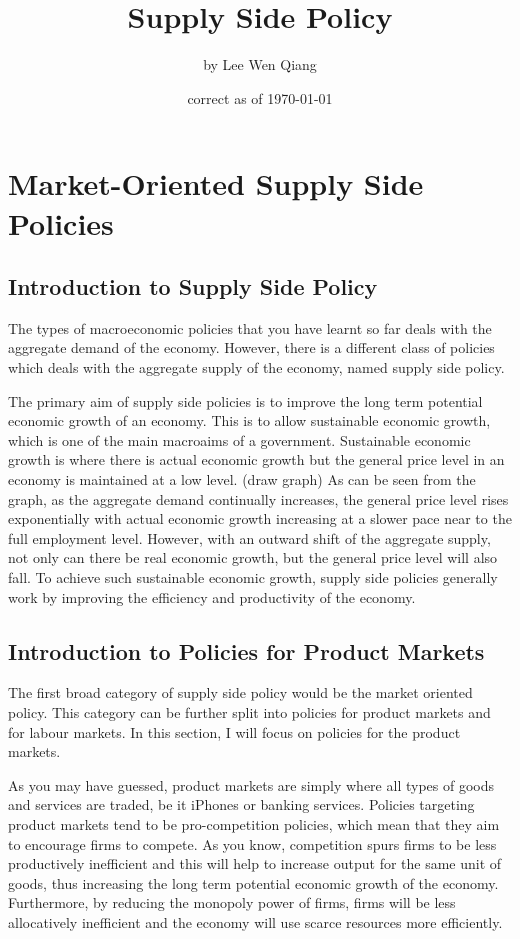 \RequirePackage{../../dominatrix}

\title{Supply Side Policy}
\author{\large by Lee Wen Qiang}
\date{\small correct as of \today}

\maketitle
\tableofcontents
\section{Market-Oriented Supply Side Policies}
\subsection{Introduction to Supply Side Policy}
The types of macroeconomic policies that you have learnt so far deals with the aggregate demand of the economy. However, there is a different class of policies which deals with the aggregate supply of the economy, named supply side policy.

The primary aim of supply side policies is to improve the long term potential economic growth of an economy. This is to allow sustainable economic growth, which is one of the main macroaims of a government. Sustainable economic growth is where there is actual economic growth but the general price level in an economy is maintained at a low level. (draw graph) As can be seen from the graph, as the aggregate demand continually increases, the general price level rises exponentially with actual economic growth increasing at a slower pace near to the full employment level. However, with an outward shift of the aggregate supply, not only can there be real economic growth, but the general price level will also fall. To achieve such sustainable economic growth, supply side policies generally work by improving the efficiency and productivity of the economy.
\subsection{Introduction to Policies for Product Markets}
The first broad category of supply side policy would be the market oriented policy. This category can be further split into policies for product markets and for labour markets. In this section, I will focus on policies for the product markets.

As you may have guessed, product markets are simply where all types of goods and services are traded, be it iPhones or banking services. Policies targeting product markets tend to be pro-competition policies, which mean that they aim to encourage firms to compete. As you know, competition spurs firms to be less productively inefficient and this will help to increase output for the same unit of goods, thus increasing the long term potential economic growth of the economy. Furthermore, by reducing the monopoly power of firms, firms will be less allocatively inefficient and the economy will use scarce resources more efficiently.
